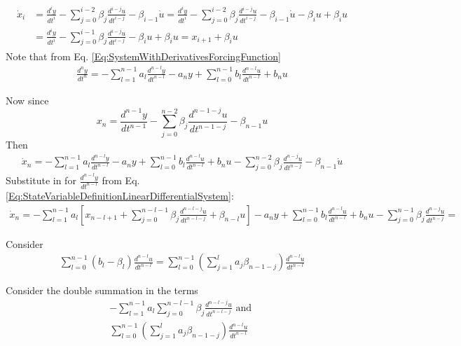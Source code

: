 \documentclass[10pt]{amsart}
\begin{document}
\begin{multicols*}{2}
\[
\begin{gathered}
	\begin{aligned}
		\dot{x}_i & = \frac{d^i y }{dt^i} - \sum_{j=0}^{i-2} \beta_j \frac{d^{i-j} u}{dt^{i-j}} - \beta_{i-1} \dot{u} = \frac{d^i y }{dt^i} - \sum_{j=0}^{i-2} \beta_j \frac{d^{i-j} u}{dt^{i-j}} - \beta_{i-1} \dot{u} -\beta_i u +\beta_i u \\
		& = \frac{d^i y }{dt^i} - \sum_{j=0}^{i-1} \beta_j \frac{d^{i-j} u}{dt^{i-j}} - \beta_i u + \beta_i u = x_{i+1} + \beta_i u
	\end{aligned}
\end{gathered}
\]
Note that from Eq. \ref{Eq:SystemWithDerivativesForcingFunction}
\[
\begin{gathered}
	\frac{d^n y}{dt^n} =- \sum_{l=1}^{n-1} a_l \frac{d^{n-l} y}{dt^{n-l}}  - a_n y + \sum_{l=0}^{n-1} b_l \frac{d^{n-l} u}{dt^{n-l }} + b_nu
\end{gathered}
\]

Now since 
\[
x_n = \frac{d^{n-1}y}{dt^{n-1}} - \sum_{j=0}^{n-2} \beta_j \frac{d^{n-1 -j} u}{dt^{n-1-j}} - \beta_{n-1} u
\]
Then
\[
\begin{gathered}
\dot{x}_n = - \sum_{l=1}^{n-1} a_l \frac{d^{n-l} y}{dt^{n-l}}  - a_n y + \sum_{l=0}^{n-1} b_l \frac{d^{n-l} u}{dt^{n-l }} + b_nu - \sum_{j=0}^{n-2} \beta_j \frac{d^{n -j} u}{dt^{n-j}} - \beta_{n-1} \dot{u} 
\end{gathered}
\]
Substitute in for $\frac{ d^{n-l}y }{dt^{n-l}}$ from Eq. \ref{Eq:StateVariableDefinitionLinearDifferentialSystem}:
\[
\begin{gathered}
	\dot{x}_n = - \sum_{l=1}^{n-1} a_l \left[ x_{n-l + 1} + \sum_{j=0}^{n - l - 1} \beta_j \frac{ d^{ n-l -j} u }{dt^{n-l -j}} + \beta_{n-l} u \right]  - a_n y + \sum_{l=0}^{n-1} b_l \frac{d^{n-l} u}{dt^{n-l }} + b_nu - \sum_{j=0}^{n-1} \beta_j \frac{d^{n -j} u}{dt^{n-j}} =
\end{gathered}
\]

Consider 
\[
\begin{gathered}
	\sum_{l=0}^{n-1} (b_l - \beta_l) \frac{d^{n-l} u}{dt^{n-l }} = \sum_{l=0}^{n-1} (\sum_{j = 1}^{l} a_j \beta_{n - 1 - j}) \frac{d^{n-l} u}{dt^{n-l }}
\end{gathered}
\]

Consider the double summation in the terms 
\[
\begin{gathered}
	- \sum_{l=1}^{n-1} a_l \sum_{j=0}^{n - l - 1} \beta_j \frac{ d^{ n-l -j} u }{dt^{n-l -j}} \text{ and } \\
	\sum_{l=0}^{n-1} (\sum_{j = 1}^{l} a_j \beta_{n - 1 - j}) \frac{d^{n-l} u}{dt^{n-l }}
\end{gathered}
\]


\end{multicols*}
\end{document}
